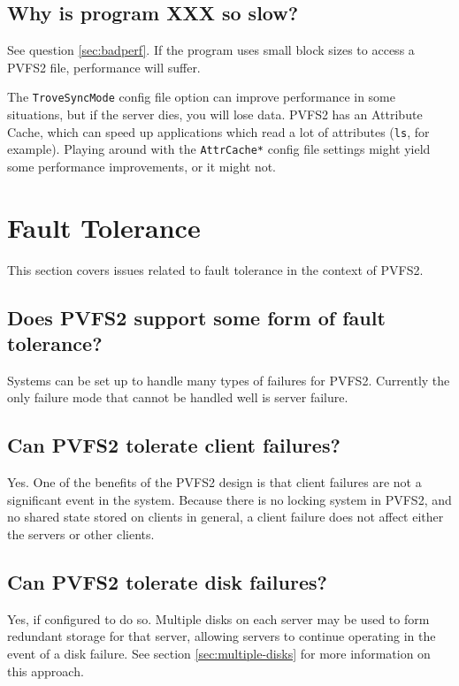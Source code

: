 \documentclass[11pt,letterpaper]{article}
\begin{document}
\subsection{Why is program XXX so slow?}
See question \ref{sec:badperf}.  If the program uses small block sizes to
access a PVFS2 file, performance will suffer.  

The \texttt{TroveSyncMode}
config file option can improve performance in some situations, but if the
server dies, you will lose data.   PVFS2 has an Attribute Cache, which can
speed up applications which read a lot of attributes (\texttt{ls}, for
example).  Playing around with the \texttt{AttrCache*} config file settings
might yield some performance improvements, or it might not. 

%
%
\section{Fault Tolerance}

This section covers issues related to fault tolerance in the context of PVFS2.

\subsection{Does PVFS2 support some form of fault tolerance?}

Systems can be set up to handle many types of failures for PVFS2.  Currently
the only failure mode that cannot be handled well is server failure.

\subsection{Can PVFS2 tolerate client failures?}

Yes.  One of the benefits of the PVFS2 design is that client failures are not a
significant event in the system.  Because there is no locking system in PVFS2,
and no shared state stored on clients in general, a client failure does not
affect either the servers or other clients.

\subsection{Can PVFS2 tolerate disk failures?}

Yes, if configured to do so.  Multiple disks on each server may be used to
form redundant storage for that server, allowing servers to continue operating
in the event of a disk failure.  See section \ref{sec:multiple-disks} for more
information on this approach.
\end{document}

